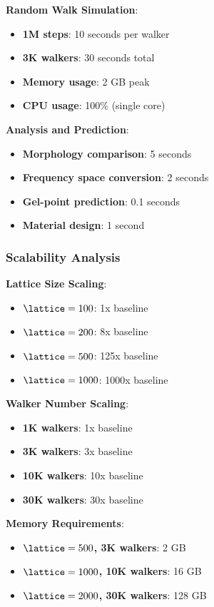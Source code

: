 \textbf{Random Walk Simulation}:
\begin{itemize}
    \item \textbf{1M steps}: 10 seconds per walker
    \item \textbf{3K walkers}: 30 seconds total
    \item \textbf{Memory usage}: 2 GB peak
    \item \textbf{CPU usage}: 100\% (single core)
\end{itemize}

\textbf{Analysis and Prediction}:
\begin{itemize}
    \item \textbf{Morphology comparison}: 5 seconds
    \item \textbf{Frequency space conversion}: 2 seconds
    \item \textbf{Gel-point prediction}: 0.1 seconds
    \item \textbf{Material design}: 1 second
\end{itemize}

\subsubsection{Scalability Analysis}
\textbf{Lattice Size Scaling}:
\begin{itemize}
    \item \textbf{$\lattice = 100$}: 1x baseline
    \item \textbf{$\lattice = 200$}: 8x baseline
    \item \textbf{$\lattice = 500$}: 125x baseline
    \item \textbf{$\lattice = 1000$}: 1000x baseline
\end{itemize}

\textbf{Walker Number Scaling}:
\begin{itemize}
    \item \textbf{1K walkers}: 1x baseline
    \item \textbf{3K walkers}: 3x baseline
    \item \textbf{10K walkers}: 10x baseline
    \item \textbf{30K walkers}: 30x baseline
\end{itemize}

\textbf{Memory Requirements}:
\begin{itemize}
    \item \textbf{$\lattice = 500$, 3K walkers}: 2 GB
    \item \textbf{$\lattice = 1000$, 10K walkers}: 16 GB
    \item \textbf{$\lattice = 2000$, 30K walkers}: 128 GB
\end{itemize}

